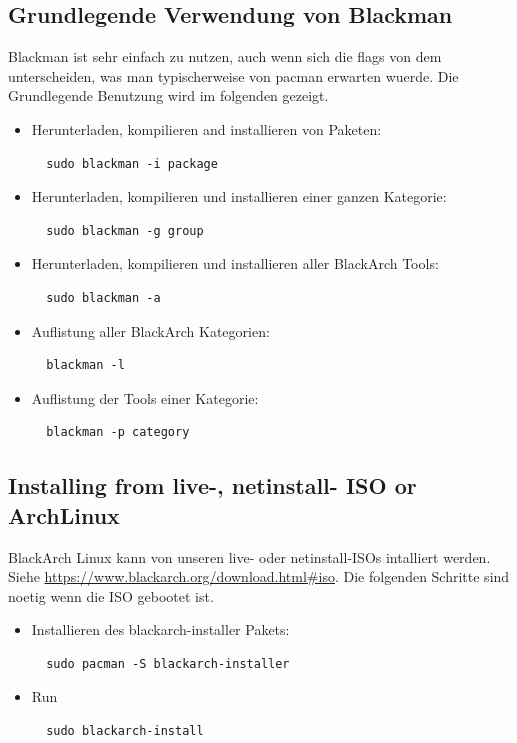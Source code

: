 \documentclass[a4paper, oneside, 11pt]{book}
\begin{document}
\subsection{Grundlegende Verwendung von Blackman} Blackman ist sehr einfach zu nutzen, auch wenn sich die flags von dem unterscheiden, was man typischerweise von pacman erwarten wuerde. 
Die Grundlegende Benutzung wird im folgenden gezeigt.
\begin{itemize}
\item Herunterladen, kompilieren and installieren von Paketen:
\begin{lstlisting}
  sudo blackman -i package
\end{lstlisting}

\item Herunterladen, kompilieren und installieren einer ganzen Kategorie:
\begin{lstlisting}
  sudo blackman -g group
\end{lstlisting}

\item Herunterladen, kompilieren und installieren aller BlackArch Tools:
\begin{lstlisting}
  sudo blackman -a
\end{lstlisting}

\item Auflistung aller BlackArch Kategorien:
\begin{lstlisting}
  blackman -l
\end{lstlisting}

\item Auflistung der Tools einer Kategorie:
\begin{lstlisting}
  blackman -p category
\end{lstlisting}

\end{itemize}

\subsection{Installing from live-, netinstall- ISO or ArchLinux}
BlackArch Linux kann von unseren live- oder netinstall-ISOs intalliert werden. \\Siehe
\url{https://www.blackarch.org/download.html#iso}. Die folgenden Schritte sind noetig wenn die ISO gebootet ist.
\begin{itemize}
\item Installieren des blackarch-installer Pakets:
\begin{lstlisting}
  sudo pacman -S blackarch-installer
\end{lstlisting}

\item Run
\begin{lstlisting}
  sudo blackarch-install
\end{lstlisting}

\end{itemize}
\end{document}
